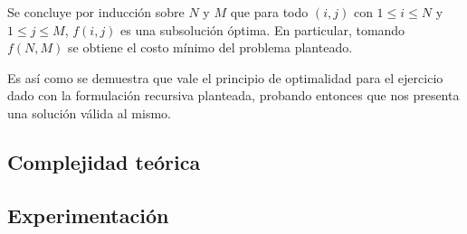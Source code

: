 	Se concluye por inducción sobre $N$ y $M$ que para todo $(i, j)$ con $1 \leq
	i \leq N$ y $1 \leq j \leq M$, $f(i, j)$ es una subsolución óptima. En
	particular, tomando $f(N, M)$ se obtiene el costo mínimo del problema
	planteado.

	Es así como se demuestra que vale el principio de optimalidad para el
	ejercicio dado con la formulación recursiva planteada, probando entonces que
	nos presenta una solución válida al mismo.

    \subsection{Complejidad teórica}

    \subsection{Experimentación}

